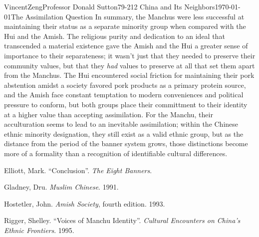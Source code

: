 \documentclass{article}[12pt]
\begin{document}
\begin{mla}{Vincent}{Zeng}{Professor Donald Sutton}{79-212 China and Its Neighbors}{\today}{The Assimilation Question}
In summary, the Manchus were less successful at maintaining their status as a
separate minority group when compared with the  Hui and the Amish. The
religious purity and dedication to an ideal that transcended a material
existence gave the Amish and the Hui a greater sense of importance to their
separateness; it wasn't just that they needed to preserve their community
values, but that they \textit{had} values to preserve at all that set them
apart from the Manchus. The Hui encountered social friction for maintaining
their pork abstention amidst a society favored pork products as a primary
protein source, and the Amish face constant temptation to modern conveniences
and political pressure to conform, but both groups place their committment to
their identity at a higher value than accepting assimilation.  For the Manchu, their acculturation seems to lead to an inevitable assimilation; within the Chinese ethnic minority designation, they still exist as a valid ethnic group, but as the distance from the period of the banner system grows, those distinctions become more of a formality than a recognition of identifiable cultural differences.

\begin{workscited}
	
	\bibent
	Elliott, Mark. ``Conclusion''. \textit{The Eight Banners}.

	\bibent
	Gladney, Dru. \textit{Muslim Chinese}. 1991.

	\bibent
	Hostetler, John. \textit{Amish Society}, fourth edition. 1993.

	\bibent
	Rigger, Shelley. ``Voices of Manchu Identity''. \textit{Cultural Encounters on China's Ethnic Frontiers}. 1995.
\end{workscited}
\end{mla}
\end{document}

